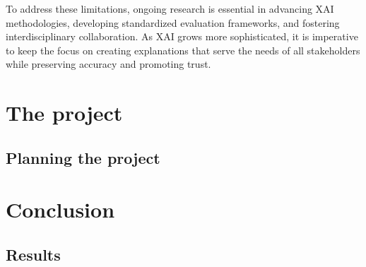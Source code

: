 \documentclass[UKenglish]{uiomasterthesis}
\begin{document}
To address these limitations, ongoing research is essential in advancing XAI methodologies, developing standardized evaluation frameworks, and fostering interdisciplinary collaboration. As XAI grows more sophisticated, it is imperative to keep the focus on creating explanations that serve the needs of all stakeholders while preserving accuracy and promoting trust.


\part{The project}                    
\chapter{Planning the project}        

\part{Conclusion}                    
\chapter{Results}                     

\backmatter{}
\printbibliography{}
\end{document}
